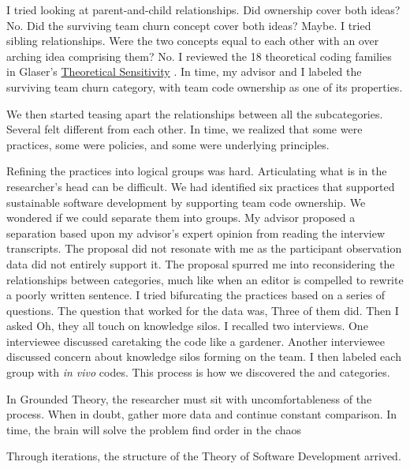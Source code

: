 I tried looking at parent-and-child relationships. Did ownership cover both ideas? No. Did the surviving team churn concept cover both ideas? Maybe. I tried sibling relationships. Were the two concepts equal to each other with an over arching idea comprising them?  No. I reviewed the 18 theoretical coding families in Glaser's \underline{Theoretical Sensitivity} \cite{GlaserTheoreticalSensitivity}. In time, my advisor and I labeled the surviving team churn category,  with team code ownership as one of its properties. 

We then started teasing apart the relationships between all the subcategories. Several felt different from each other. In time, we realized that some were practices, some were policies, and some were underlying principles. 

Refining the practices into logical groups was hard. Articulating what is in the researcher's head can be difficult. We had identified six practices that supported sustainable software development by supporting team code ownership. We wondered if we could separate them into groups. My advisor proposed a separation based upon my advisor's expert opinion from reading the interview transcripts. The proposal did not resonate with me as the participant observation data did not entirely support it. The proposal spurred me into reconsidering the relationships between categories, much like when an editor is compelled to rewrite a poorly written sentence. I tried bifurcating the practices based on a series of questions. The question that worked for the data was,  Three of them did. Then I asked  Oh, they all touch on knowledge silos. I recalled two interviews. One interviewee discussed caretaking the code like a gardener. Another interviewee discussed concern about knowledge silos forming on the team. I then labeled each group with \textit{in vivo} codes. This process is how we discovered the  and  categories. 

In Grounded Theory, the researcher must sit with uncomfortableness of the process. When in doubt, gather more data and continue constant comparison. In time, the brain will solve the problem find order in the chaos 

Through iterations, the structure of the Theory of Software Development arrived. 

